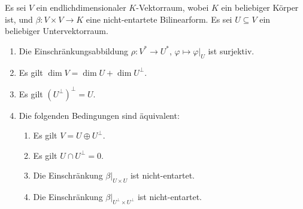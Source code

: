 \documentclass[a4paper,10pt,numbers=noenddot]{scrartcl}
\begin{document}
\begin{proposition}\label{prop: orthogonal decomposition for nondegenerate symmetric forms}
  Es sei $V$ ein endlichdimensionaler $K$-Vektorraum, wobei $K$ ein beliebiger Körper ist, und $\beta \colon V \times V \to K$ eine nicht-entartete Bilinearform.
  Es sei $U \subseteq V$ ein beliebiger Untervektorraum.
  \begin{enumerate}[leftmargin=*]
    \item
      Die Einschränkungsabbildung $\rho \colon V^* \to U^*$, $\varphi \mapsto \varphi|_U$ ist surjektiv.
    \item
      Es gilt $\dim V = \dim U + \dim U^\perp$.
    \item
      Es gilt $(U^\perp)^\perp = U$.
    \item
      Die folgenden Bedingungen sind äquivalent:
      \begin{enumerate}
        \item
          Es gilt $V = U \oplus U^\perp$.
        \item
          Es gilt $U \cap U^\perp = 0$.
        \item
          Die Einschränkung $\beta|_{U \times U}$ ist nicht-entartet.
        \item
          Die Einschränkung $\beta|_{U^\perp \times U^\perp}$ ist nicht-entartet.
      \end{enumerate}
  \end{enumerate}
\end{proposition}
\end{document}
